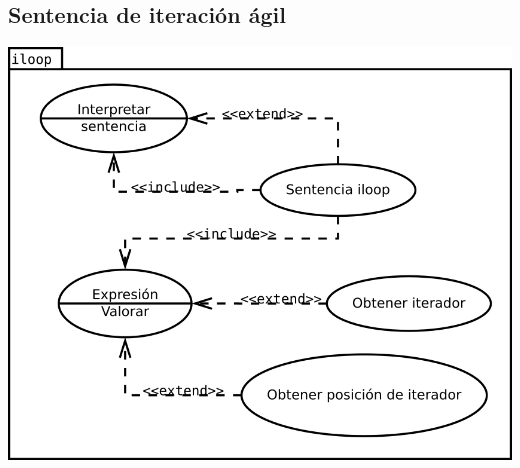\subsection {Sentencia de iteración ágil}
\begin{center}
\includegraphics[scale=0.4]{iloop.png} \\
\end{center}
